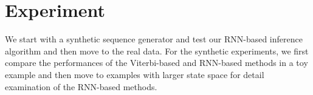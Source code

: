 	\section{Experiment}

	
	
	
	
	We start with a synthetic sequence generator and test our RNN-based inference algorithm and then move to the real data. 
	For the synthetic experiments, we first compare the performances of the Viterbi-based and RNN-based methods in a toy example and then move to examples with larger state space for detail examination of the RNN-based methods. 
	
